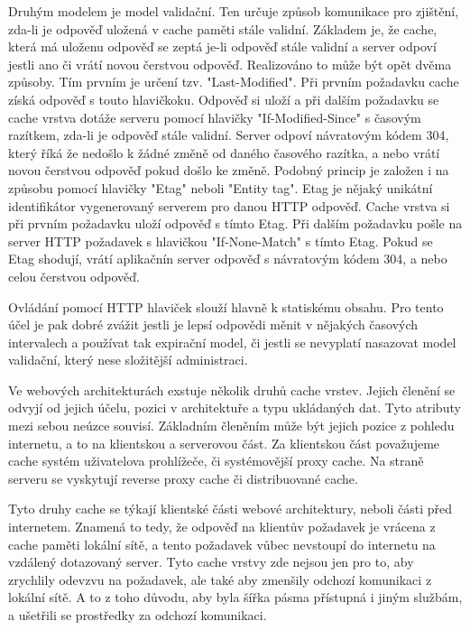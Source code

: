 \documentclass[12pt]{article}
\begin{document}
Druhým modelem je model validační. Ten určuje způsob komunikace pro zjištění, zda-li je odpověď uložená v cache paměti stále validní. Základem je, že cache, která má uloženu odpověď se zeptá je-li odpověď stále validní a server odpoví jestli ano či vrátí novou čerstvou odpověď. Realizováno to může být opět dvěma způsoby. Tím prvním je určení tzv. "Last-Modified". Při prvním požadavku cache získá odpověď s touto hlavičkoku. Odpověď si uloží a při dalším požadavku se cache vrstva dotáže serveru pomocí hlavičky "If-Modified-Since" s časovým razítkem, zda-li je odpověď stále validní. Server odpoví návratovým kódem 304, který říká že nedošlo k žádné změně od daného časového razítka, a nebo vrátí novou čerstvou odpověď pokud došlo ke změně. Podobný princip je založen i na způsobu pomocí hlavičky "Etag" neboli "Entity tag". Etag je nějaký unikátní identifikátor vygenerovaný serverem pro danou HTTP odpověď. Cache vrstva si při prvním požadavku uloží odpověď s tímto Etag. Při dalším požadavku pošle na server HTTP požadavek s hlavičkou "If-None-Match" s tímto Etag. Pokud se Etag shodují, vrátí aplikačnín server odpověď s návratovým kódem 304, a nebo celou čerstvou odpověď.\cite{rfc-http}

Ovládání pomocí HTTP hlaviček slouží hlavně k statiskému obsahu. Pro tento účel je pak dobré zvážit jestli je lepsí odpovědi měnit v nějakých časových intervalech a používat tak expirační model, či jestli se nevyplatí nasazovat model validační, který nese složitější administraci.

Ve webových architekturách exstuje několik druhů cache vrstev. Jejich členění se odvyjí od jejich účelu, pozici v architektuře a typu ukládaných dat. Tyto atributy mezi sebou neúzce souvisí. Základním členěním může být jejich pozice z pohledu internetu, a to na klientskou a serverovou část. Za klientskou část považujeme cache systém uživatelova prohlížeče, či systémovější proxy cache. Na straně serveru se vyskytují reverse proxy cache či distribuované cache.

\obrazek
{}

Tyto druhy cache se týkají klientské části webové architektury, neboli části před internetem. Znamená to tedy, že odpověď na klientův požadavek je vrácena z cache paměti lokální sítě, a tento požadavek vůbec nevstoupí do internetu na vzdálený dotazovaný server. Tyto cache vrstvy zde nejsou jen pro to, aby zrychlily odevzvu na požadavek, ale také aby zmenšily odchozí komunikaci z lokální sítě. A to z toho důvodu, aby byla šířka pásma přístupná i jiným službám, a ušetřili se prostředky za odchozí komunikaci.
\end{document}
